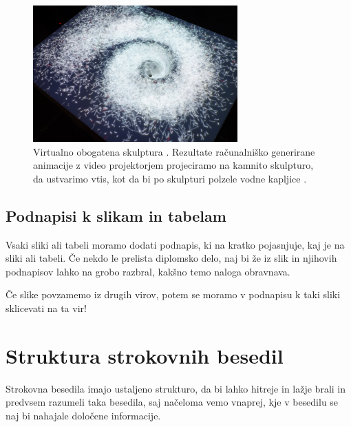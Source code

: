 \documentclass[a4paper,12pt,openright]{book}
\begin{document}
\begin{figure}[htb]
\begin{center}
\includegraphics[width=0.7\textwidth]{galaksija}
\end{center}
\caption{Virtualno obogatena skulptura \cite{vodnjak}. Rezultate računalniško generirane animacije z video projektorjem projeciramo na kamnito skulpturo, da ustvarimo vtis, kot da bi po skulpturi polzele vodne kapljice \cite{video,solina2020skulpture}.}
\label{pic1}
\end{figure}



\section{Podnapisi k slikam in tabelam}

Vsaki sliki ali tabeli moramo dodati podnapis, ki na kratko pojasnjuje, kaj je na sliki ali tabeli. 
Če nekdo le prelista diplomsko delo, naj bi že iz slik in njihovih podnapisov lahko na grobo razbral, kakšno temo naloga obravnava.

Če slike povzamemo iz drugih virov, potem se moramo v podnapisu k taki sliki sklicevati na ta vir!


\chapter{Struktura strokovnih besedil}
\label{stroka}

Strokovna besedila imajo ustaljeno strukturo, da bi lahko hitreje in lažje brali in predvsem razumeli taka besedila, saj načeloma vemo vnaprej, 
kje v besedilu se naj bi nahajale določene informacije.
\end{document}
